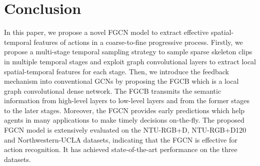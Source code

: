 \documentclass[runningheads]{llncs}
\begin{document}
\vspace{-1mm}
\section{Conclusion}
In this paper, we propose a novel FGCN model to extract effective spatial-temporal features of actions in a coarse-to-fine progressive process. Firstly, we propose a multi-stage temporal sampling strategy to sample sparse skeleton clips in multiple temporal stages and exploit graph convolutional layers to extract local spatial-temporal features for each stage. Then, we introduce the feedback mechanism into conventional GCNs by proposing the FGCB which is a local graph convolutional dense network. The FGCB transmits the semantic information from high-level layers to low-level layers and from the former stages to the later stages. Moreover, the FGCN provides early predictions which help agents in many applications to make timely decisions on-the-fly.
The proposed FGCN model is extensively evaluated on the NTU-RGB+D, NTU-RGB+D120 and Northwestern-UCLA datasets, indicating that the FGCN is effective for action recognition. It has achieved state-of-the-art performance on the three datasets.




\end{document}
